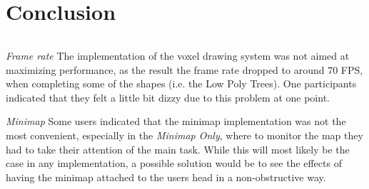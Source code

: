 
\chapter{Conclusion}


\subparagraph[Future work]{}
\textit{Frame rate} The implementation of the voxel drawing system was not aimed at maximizing performance, as the result the frame rate dropped to around 70 FPS, when completing some of the shapes (i.e. the Low Poly Trees). One participants indicated that they felt a little bit dizzy due to this problem at one point.

\textit{Minimap} Some users indicated that the minimap implementation was not the most convenient, especially in the \textit{Minimap Only}, where to monitor the map they had to take their attention of the main task. While this will most likely be the case in any implementation, a possible solution would be to see the effects of having the minimap attached to the users head in a non-obstructive way.